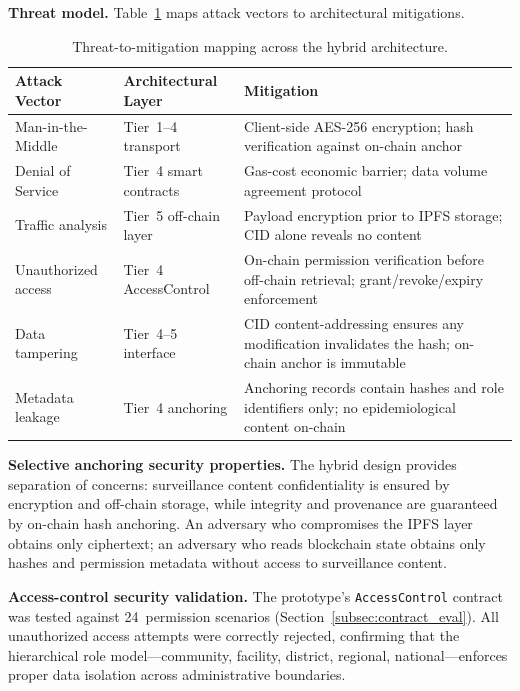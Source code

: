 \textbf{Threat model.} Table~\ref{tab:threats_eval} maps attack vectors to architectural mitigations.

\begin{table}[!ht]
\caption{Threat-to-mitigation mapping across the hybrid architecture.}\label{tab:threats_eval}
\centering
\small
\begin{tabular}{p{2.2cm}p{2.5cm}p{2.8cm}}
\toprule
\textbf{Attack Vector} & \textbf{Architectural Layer} & \textbf{Mitigation} \\
\midrule
Man-in-the-Middle & Tier~1--4 transport & Client-side AES-256 encryption; hash verification against on-chain anchor \\
\midrule
Denial of Service & Tier~4 smart contracts & Gas-cost economic barrier; data volume agreement protocol \\
\midrule
Traffic analysis & Tier~5 off-chain layer & Payload encryption prior to IPFS storage; CID alone reveals no content \\
\midrule
Unauthorized access & Tier~4 AccessControl & On-chain permission verification before off-chain retrieval; grant/revoke/expiry enforcement \\
\midrule
Data tampering & Tier~4--5 interface & CID content-addressing ensures any modification invalidates the hash; on-chain anchor is immutable \\
\midrule
Metadata leakage & Tier~4 anchoring & Anchoring records contain hashes and role identifiers only; no epidemiological content on-chain \\
\bottomrule
\end{tabular}
\end{table}

\textbf{Selective anchoring security properties.} The hybrid design provides separation of concerns: surveillance content confidentiality is ensured by encryption and off-chain storage, while integrity and provenance are guaranteed by on-chain hash anchoring. An adversary who compromises the IPFS layer obtains only ciphertext; an adversary who reads blockchain state obtains only hashes and permission metadata without access to surveillance content.

\textbf{Access-control security validation.} The prototype's \texttt{AccessControl} contract was tested against 24~permission scenarios (Section~\ref{subsec:contract_eval}). All unauthorized access attempts were correctly rejected, confirming that the hierarchical role model---community, facility, district, regional, national---enforces proper data isolation across administrative boundaries.

